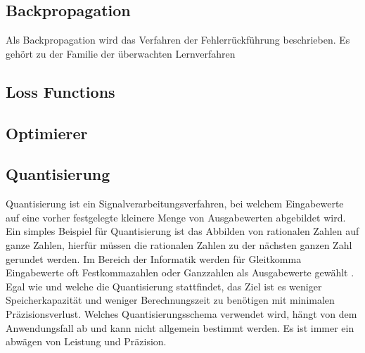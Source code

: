 
\subsection{Backpropagation}
Als Backpropagation wird das Verfahren der Fehlerrückführung beschrieben. Es gehört zu der Familie der überwachten Lernverfahren





\subsection{Loss Functions}

\subsection{Optimierer}


\subsection{Quantisierung}

Quantisierung ist ein Signalverarbeitungsverfahren, bei welchem Eingabewerte auf eine vorher festgelegte kleinere Menge von Ausgabewerten abgebildet wird. Ein simples Beispiel für Quantisierung ist das Abbilden von rationalen Zahlen auf ganze Zahlen, hierfür müssen die rationalen Zahlen zu der nächsten ganzen Zahl gerundet werden. Im Bereich der Informatik werden für Gleitkomma Eingabewerte oft Festkommazahlen oder Ganzzahlen als Ausgabewerte gewählt \cite{Gysel2016}. Egal wie und welche die Quantisierung stattfindet, das Ziel ist es weniger Speicherkapazität und weniger Berechnungszeit zu benötigen mit minimalen Präzisionsverlust. Welches Quantisierungsschema verwendet wird, hängt von dem Anwendungsfall ab und kann nicht allgemein bestimmt werden. Es ist immer ein abwägen von Leistung und Präzision.

